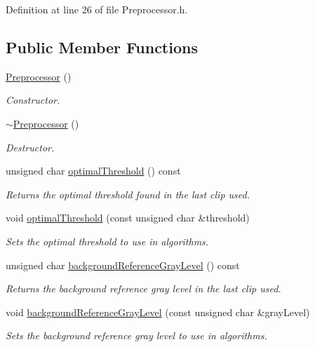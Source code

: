 Definition at line 26 of file Preprocessor.h.\subsection*{Public Member Functions}
\begin{CompactItemize}
\item 
\hyperlink{class_preprocessor_da966c8b83e7c3bcd8759549c3cdf688}{Preprocessor} ()
\begin{CompactList}\small\item\em Constructor. \item\end{CompactList}\item 
\hyperlink{class_preprocessor_3c16724bc9e18b12a45f5a7fe2752b1b}{$\sim$Preprocessor} ()
\begin{CompactList}\small\item\em Destructor. \item\end{CompactList}\item 
unsigned char \hyperlink{class_preprocessor_1d8eaa1cf786941dbfa1eca95b46ce0c}{optimalThreshold} () const 
\begin{CompactList}\small\item\em Returns the optimal threshold found in the last clip used. \item\end{CompactList}\item 
void \hyperlink{class_preprocessor_1fc44d7d19944f3c3addd3a576c37414}{optimalThreshold} (const unsigned char \&threshold)
\begin{CompactList}\small\item\em Sets the optimal threshold to use in algorithms. \item\end{CompactList}\item 
unsigned char \hyperlink{class_preprocessor_9a2684181b5f43051fe53d7d2950dd36}{backgroundReferenceGrayLevel} () const 
\begin{CompactList}\small\item\em Returns the background reference gray level in the last clip used. \item\end{CompactList}\item 
void \hyperlink{class_preprocessor_03340329e31bd1f01ace27d77b5616ef}{backgroundReferenceGrayLevel} (const unsigned char \&grayLevel)
\begin{CompactList}\small\item\em Sets the background reference gray level to use in algorithms. \item\end{CompactList}\item 

\end{CompactItemize}
